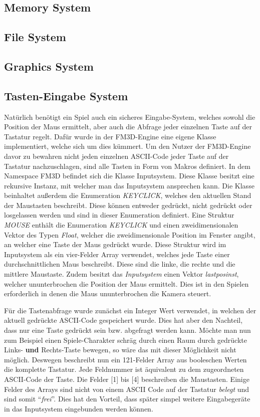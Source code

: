 \subsection{Memory System}
\subsection{File System}
\subsection{Graphics System}


\subsection{Tasten-Eingabe System}
Natürlich benötigt ein Spiel auch ein sicheres Eingabe-System, welches sowohl die Position der Maus ermittelt, aber auch die Abfrage jeder einzelnen Taste auf der Tastatur regelt. 
Dafür wurde in der FM3D-Engine eine eigene Klasse implementiert, welche sich um dies kümmert.
Um den Nutzer der FM3D-Engine davor zu bewahren nicht jeden einzelnen ASCII-Code jeder Taste auf der Tastatur nachzuschlagen, sind alle Tasten in Form von Makros definiert. 
In dem Namespace FM3D befindet sich die Klasse Inputsystem. Diese Klasse besitzt eine rekursive Instanz, mit welcher man das Inputsystem ansprechen kann. 
Die Klasse beinhaltet außerdem die Enumeration \textit{KEYCLICK}, welches den aktuellen Stand der Maustasten beschreibt. Diese können entweder gedrückt, nicht gedrückt oder losgelassen werden und sind in dieser Enumeration definiert.
Eine Struktur \textit{MOUSE} enthält die Enumeration \textit{KEYCLICK} und einen zweidimensionalen Vektor des Typen \textit{Float}, welcher die zweidimensionale Position im Fenster angibt, an welcher eine Taste der Maus gedrückt wurde.
Diese Struktur wird im Inputsystem als ein vier-Felder Array verwendet, welches jede Taste einer durchschnittlichen Maus beschreibt. Diese sind die linke, die rechte und die mittlere Maustaste. 
Zudem besitzt das \textit{Inputsystem} einen Vektor \textit{lastposinst}, welcher ununterbrochen die Position der Maus ermittelt. Dies ist in den Spielen erforderlich in denen die Maus ununterbrochen die Kamera steuert.

Für die Tastenabfrage wurde zunächst ein Integer Wert verwendet, in welchen der aktuell gedrückte ASCII-Code gespeichert wurde. Dies hat aber den Nachteil, dass nur eine Taste gedrückt sein bzw. abgefragt werden kann. Möchte man nun zum Beispiel einen Spiele-Charakter schräg durch einen Raum durch gedrückte Links- \textbf{und} Rechts-Taste bewegen, so wäre das mit dieser Möglichkeit nicht möglich. Deswegen beschreibt nun ein 121-Felder Array aus booleschen Werten die komplette Tastatur. Jede Feldnummer ist äquivalent zu dem zugeordneten ASCII-Code der Taste. Die Felder [1] bis [4] beschreiben die Maustasten. Einige Felder des Arrays sind nicht von einem ASCII Code auf der Tastatur \textit{belegt} und sind somit "`\textit{frei}"'. Dies hat den Vorteil, dass später simpel weitere Eingabegeräte in das Inputsystem eingebunden werden können.


